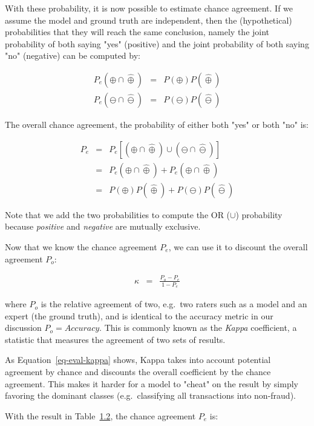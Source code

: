\documentclass[
  letterpaper,
]{scrbook}
\begin{document}
With these probability, it is now possible to estimate chance agreement.
If we assume the model and ground truth are independent, then the
(hypothetical) probabilities that they will reach the same conclusion,
namely the joint probability of both saying "yes" (positive) and the
joint probability of both saying "no" (negative) can be computed by:

\[\begin{aligned}
  P_e(\oplus \cap \hat{\oplus}) & = & P(\oplus) P(\hat{\oplus}) \\
  P_e(\ominus \cap \hat{\ominus}) & = & P(\ominus) P(\hat{\ominus})
\end{aligned}\]

The overall chance agreement, the probability of either both "yes" or
both "no" is:

\[\begin{aligned}
   P_e
   & = & P_e[ (\oplus \cap \hat{\oplus}) \cup  (\ominus \cap \hat{\ominus})]  \\
   & = & P_e(\oplus \cap \hat{\oplus}) + P_e(\oplus \cap \hat{\oplus})  \\
   & = & P(\oplus) P(\hat{\oplus}) + P(\ominus) P(\hat{\ominus})
\end{aligned}\]

Note that we add the two probabilities to compute the OR (\(\cup\))
probability because \emph{positive} and \emph{negative} are mutually
exclusive.

Now that we know the chance agreement \(P_e\), we can use it to discount
the overall agreement \(P_o\):

\[\begin{aligned}
   \kappa & = & \frac{P_o - P_e}{1 - P_e}
\end{aligned}\]

where \(P_o\) is the relative agreement of two, e.g.~two raters such as
a model and an expert (the ground truth), and is identical to the
accuracy metric in our discussion \(P_o = Accuracy\). This is commonly
known as the \emph{Kappa} coefficient, a statistic that measures the
agreement of two sets of results.

As Equation~\hyperref[eq-eval-kappa]{{[}eq-eval-kappa{]}} shows, Kappa
takes into account potential agreement by chance and discounts the
overall coefficient by the chance agreement. This makes it harder for a
model to "cheat" on the result by simply favoring the dominant classes
(e.g.~classifying all transactions into non-fraud).

With the result in Table~\hyperref[tab-eval-cmatrix0]{1.2}, the chance
agreement \(P_e\) is:
\end{document}
